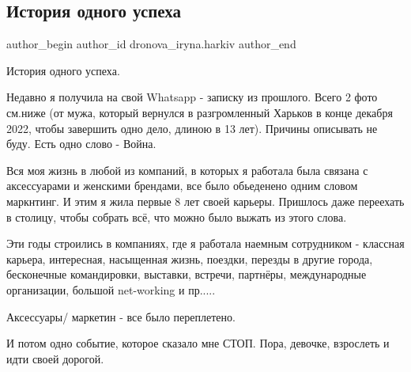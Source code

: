  
 
 
 
 

\subsection{История одного успеха}
\label{sec:14_01_2023.fb.dronova_iryna.harkiv.1.istoriya_odnogo_uspe}

\ifcmt
 author_begin
   author_id dronova_iryna.harkiv
 author_end
\fi

История одного успеха. 

Недавно я получила на свой Whatsapp - записку из прошлого. Всего 2 фото см.ниже
(от мужа, который вернулся в разгромленный Харьков в конце декабря 2022, чтобы
завершить одно дело, длиною в 13 лет). Причины описывать не буду. Есть одно
слово - Война. 

Вся моя жизнь в любой из компаний, в которых я работала была связана с
аксессуарами и женскими брендами, все было обьеденено одним словом маркнтинг. И
этим я жила первые 8 лет своей карьеры. Пришлось даже переехать в столицу,
чтобы собрать всё, что можно было выжать из этого слова. 

Эти годы строились в компаниях, где я работала наемным сотрудником - классная
карьера, интересная, насыщенная жизнь,  поездки, перезды в другие города,
бесконечные командировки, выставки, встречи, партнёры, международные
организации, большой net-working  и пр.....

Аксессуары/ маркетин - все было переплетено.

И потом одно событие, которое сказало мне СТОП. Пора, девочке, взрослеть и идти
своей дорогой.

